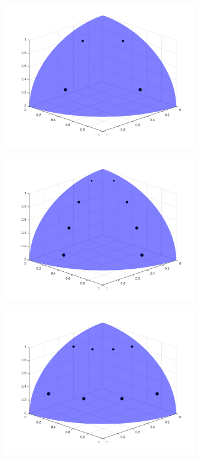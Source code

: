 \begin{figure}
\centering
	\begin{subfigure}[b]{0.48\textwidth}
		\centering
		\includegraphics[width=0.92\textwidth]{figures/sec_Sn/PGLC2_2_3D.png}
		\caption{}
	\end{subfigure}
	\hfill
	\begin{subfigure}[b]{0.48\textwidth}
		\centering
		\includegraphics[width=0.92\textwidth]{figures/sec_Sn/PGLC2_4_3D.png}
		\caption{}
	\end{subfigure}
	\vfill
	\begin{subfigure}[b]{0.48\textwidth}
		\centering
		\includegraphics[width=0.92\textwidth]{figures/sec_Sn/PGLC4_2_3D.png}

\end{subfigure}
\end{figure}
